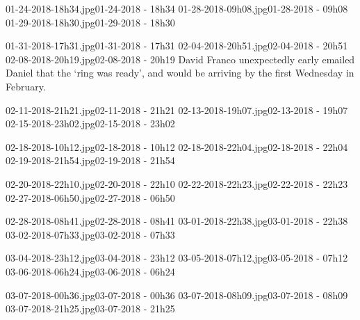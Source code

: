 ﻿\documentclass[letterpaper, 12pt, landscape]{ProgressBook}
\begin{document}
{01-24-2018-18h34.jpg}{01-24-2018 - 18h34}
{01-28-2018-09h08.jpg}{01-28-2018 - 09h08}
{01-29-2018-18h30.jpg}{01-29-2018 - 18h30}

{01-31-2018-17h31.jpg}{01-31-2018 - 17h31}
{02-04-2018-20h51.jpg}{02-04-2018 - 20h51}
{02-08-2018-20h19.jpg}{02-08-2018 - 20h19}
{David Franco unexpectedly early emailed Daniel that the `ring was ready', and would be arriving by the first Wednesday in February.}

{02-11-2018-21h21.jpg}{02-11-2018 - 21h21}
{02-13-2018-19h07.jpg}{02-13-2018 - 19h07}
{02-15-2018-23h02.jpg}{02-15-2018 - 23h02}

{02-18-2018-10h12.jpg}{02-18-2018 - 10h12}
{02-18-2018-22h04.jpg}{02-18-2018 - 22h04}
{02-19-2018-21h54.jpg}{02-19-2018 - 21h54}

{02-20-2018-22h10.jpg}{02-20-2018 - 22h10}
{02-22-2018-22h23.jpg}{02-22-2018 - 22h23}
{02-27-2018-06h50.jpg}{02-27-2018 - 06h50}
{}

{02-28-2018-08h41.jpg}{02-28-2018 - 08h41}
{03-01-2018-22h38.jpg}{03-01-2018 - 22h38}
{03-02-2018-07h33.jpg}{03-02-2018 - 07h33}

{03-04-2018-23h12.jpg}{03-04-2018 - 23h12}
{03-05-2018-07h12.jpg}{03-05-2018 - 07h12}
{03-06-2018-06h24.jpg}{03-06-2018 - 06h24}

{03-07-2018-00h36.jpg}{03-07-2018 - 00h36}
{03-07-2018-08h09.jpg}{03-07-2018 - 08h09}
{03-07-2018-21h25.jpg}{03-07-2018 - 21h25}
\end{document}
